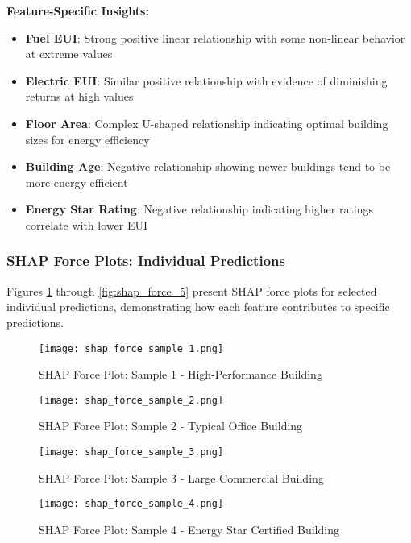 \textbf{Feature-Specific Insights:}
\begin{itemize}
    \item \textbf{Fuel EUI}: Strong positive linear relationship with some non-linear behavior at extreme values
    \item \textbf{Electric EUI}: Similar positive relationship with evidence of diminishing returns at high values
    \item \textbf{Floor Area}: Complex U-shaped relationship indicating optimal building sizes for energy efficiency
    \item \textbf{Building Age}: Negative relationship showing newer buildings tend to be more energy efficient
    \item \textbf{Energy Star Rating}: Negative relationship indicating higher ratings correlate with lower EUI
\end{itemize}

\subsubsection{SHAP Force Plots: Individual Predictions}

Figures \ref{fig:shap_force_1} through \ref{fig:shap_force_5} present SHAP force plots for selected individual predictions, demonstrating how each feature contributes to specific predictions.

\begin{figure}[h!]
\centering
\texttt{[image: shap\_force\_sample\_1.png]}
\caption{SHAP Force Plot: Sample 1 - High-Performance Building}
\label{fig:shap_force_1}
\end{figure}

\begin{figure}[h!]
\centering
\texttt{[image: shap\_force\_sample\_2.png]}
\caption{SHAP Force Plot: Sample 2 - Typical Office Building}
\label{fig:shap_force_2}
\end{figure}

\begin{figure}[h!]
\centering
\texttt{[image: shap\_force\_sample\_3.png]}
\caption{SHAP Force Plot: Sample 3 - Large Commercial Building}
\label{fig:shap_force_3}
\end{figure}

\begin{figure}[h!]
\centering
\texttt{[image: shap\_force\_sample\_4.png]}
\caption{SHAP Force Plot: Sample 4 - Energy Star Certified Building}
\label{fig:shap_force_4}
\end{figure}

